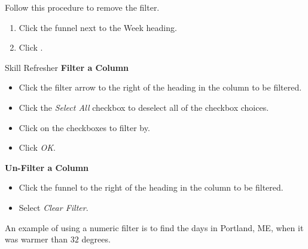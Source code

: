 Follow this procedure to remove the filter.

\begin{enumbox}
	\begin{enumerate}
		\item Click the funnel next to the Week heading.
		\item Click .
	\end{enumerate}
\end{enumbox}
	
\begin{center}
	\begin{sklbox}{Skill Refresher}
		\textbf{Filter a Column}
		\\
		\begin{itemize}
			\setlength{\itemsep}{0pt}
			\setlength{\parskip}{0pt}
			\setlength{\parsep}{0pt}

			\item Click the filter arrow to the right of the heading in the column to be filtered.
			\item Click the \textit{Select All} checkbox to deselect all of the checkbox choices.
			\item Click on the checkboxes to filter by.
			\item Click \textit{OK}.
			
		\end{itemize}
		
		\bigskip
		\textbf{Un-Filter a Column}
		
		\begin{itemize}
			\setlength{\itemsep}{0pt}
			\setlength{\parskip}{0pt}
			\setlength{\parsep}{0pt}
			
			\item Click the funnel to the right of the heading in the column to be filtered.
			\item Select \textit{Clear Filter}.
			
		\end{itemize}
	\end{sklbox}
\end{center}

An example of using a numeric filter is to find the days in Portland, ME, when it was warmer than $ 32 $ degrees.

